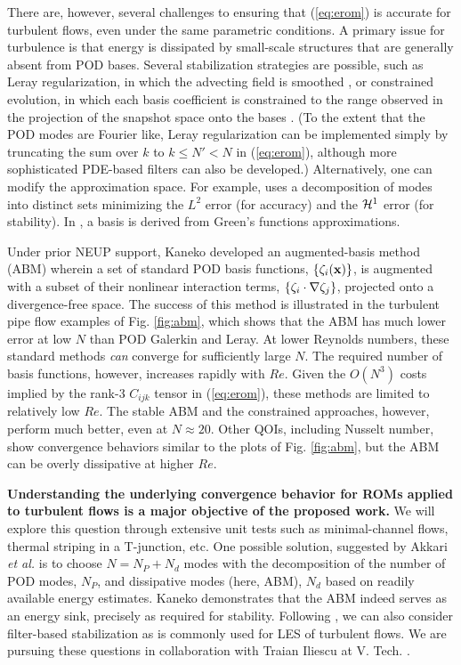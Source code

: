 There are, however, several challenges to ensuring that (\ref{eq:erom})
is accurate for turbulent flows, even under the same parametric conditions.
A primary issue for turbulence is that energy is dissipated by small-scale
structures that are generally absent from POD bases.  Several stabilization
strategies are possible, such as Leray regularization, in which the advecting
field is smoothed \cite{wells2017evolve}, or constrained evolution, in which
each basis coefficient is constrained to the range observed in the projection
of the snapshot space onto the bases \cite{fick18}.  (To the extent that the
POD modes are Fourier like, Leray regularization can be implemented simply by
truncating the sum over $k$ to $k \leq N' < N$ in (\ref{eq:erom}), although
more sophisticated PDE-based filters can also be developed.) Alternatively,
one can modify the approximation space.  For example,
\cite{akkari19} uses a decomposition of modes into distinct sets minimizing the
$L^2$ error (for accuracy) and the ${\cal H}^1$ error (for stability).  In
\cite{khodkar2019}, a basis is derived from Green's functions approximations.

   Under prior NEUP support, Kaneko \cite{kaneko22a,kaneko22} developed an
augmented-basis method (ABM) wherein a set of standard POD basis functions,
$\{\mathbf{\zeta}_i(\mathbf{x}) \}$,  is augmented with a subset of their nonlinear
interaction terms, $\{\mathbf{\zeta}_i \cdot \nabla \mathbf{\zeta}_j\}$, projected onto
a divergence-free space.  The success of this
method is illustrated in the turbulent pipe flow examples of Fig. \ref{fig:abm},
which shows that the ABM has much lower error at low $N$ than POD Galerkin and
Leray.  At lower Reynolds numbers, these standard methods {\em can} converge 
for sufficiently large $N$.  The required number of basis functions, however,
increases rapidly with $Re$.  Given the $O(N^3)$ costs implied by the rank-3
$C_{ijk}$ tensor in (\ref{eq:erom}), these methods are limited to relatively
low $Re$.  The stable ABM and the constrained approaches, however, perform much better,
even at $N\approx 20$.  Other QOIs, including Nusselt number, show convergence
behaviors similar to the plots of Fig. \ref{fig:abm}, but the ABM can be overly
dissipative at higher $Re$.  

\textbf{Understanding the
underlying convergence behavior for ROMs applied to turbulent flows is a major
objective of the proposed work.} We will explore this question through
extensive unit tests such as minimal-channel flows, thermal striping in a
T-junction, etc.
  One possible solution, suggested by Akkari {\em et al.} \cite{akkari19} is to
choose $N=N_P + N_d$ modes with the decomposition of the number
of POD modes, $N_P$, and dissipative modes (here, ABM), $N_d$ based on
readily available energy estimates.  
Kaneko \cite{kaneko22a,kaneko22} demonstrates that the ABM indeed serves as an
energy sink, precisely as required for stability.
  Following \cite{wells2017evolve}, we can also consider filter-based
stabilization as is commonly used for LES of turbulent flows.  We are 
pursuing these questions in collaboration with Traian Iliescu at V. Tech.
\cite{mou2021}.

